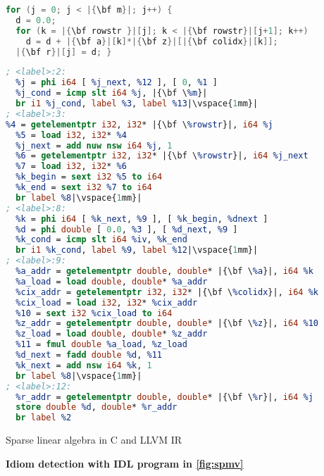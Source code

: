 \begin{lstlisting}[escapechar=|,language=C]
for (j = 0; j < |{\bf m}|; j++) {
  d = 0.0;
  for (k = |{\bf rowstr }|[j]; k < |{\bf rowstr}|[j+1]; k++)
    d = d + |{\bf a}|[k]*|{\bf z}|[|{\bf colidx}|[k]];
  |{\bf r}|[j] = d; }
\end{lstlisting}
\vspace{-1em}
\begin{lstlisting}[escapechar=|,language={LLVM},basicstyle=\linespread{0.939}\tiny\ttfamily]
; <label>:2:
  %j = phi i64 [ %j_next, %12 ], [ 0, %1 ]
  %j_cond = icmp slt i64 %j, |{\bf \%m}|
  br i1 %j_cond, label %3, label %13|\vspace{1mm}|
; <label>:3:
%4 = getelementptr i32, i32* |{\bf \%rowstr}|, i64 %j
  %5 = load i32, i32* %4
  %j_next = add nuw nsw i64 %j, 1
  %6 = getelementptr i32, i32* |{\bf \%rowstr}|, i64 %j_next
  %7 = load i32, i32* %6
  %k_begin = sext i32 %5 to i64
  %k_end = sext i32 %7 to i64
  br label %8|\vspace{1mm}|
; <label>:8:
  %k = phi i64 [ %k_next, %9 ], [ %k_begin, %dnext ]
  %d = phi double [ 0.0, %3 ], [ %d_next, %9 ]
  %k_cond = icmp slt i64 %iv, %k_end
  br i1 %k_cond, label %9, label %12|\vspace{1mm}|
; <label>:9:
  %a_addr = getelementptr double, double* |{\bf \%a}|, i64 %k
  %a_load = load double, double* %a_addr
  %cix_addr = getelementptr i32, i32* |{\bf \%colidx}|, i64 %k
  %cix_load = load i32, i32* %cix_addr
  %10 = sext i32 %cix_load to i64
  %z_addr = getelementptr double, double* |{\bf \%z}|, i64 %10
  %z_load = load double, double* %z_addr
  %11 = fmul double %a_load, %z_load
  %d_next = fadd double %d, %11
  %k_next = add nsw i64 %k, 1
  br label %8|\vspace{1mm}|
; <label>:12:
  %r_addr = getelementptr double, double* |{\bf \%r}|, i64 %j
  store double %d, double* %r_addr
  br label %2
\end{lstlisting}
\vspace{-0.287cm}
\caption{Sparse linear algebra in C and LLVM IR}
\label{fig:spmvexample1}

\centering
\vspace{0.0em}
{\centering
\begin{minipage}{0.05\linewidth}
\vspace{0pt}
\centering
{}
\end{minipage}
\begin{minipage}{\linewidth}
\centering
\textbf{Idiom detection with IDL program in \autoref{fig:spmv}}
\end{minipage}
\begin{minipage}{0.05\linewidth}
\vspace{0pt}
\centering
{}
\end{minipage}
}

